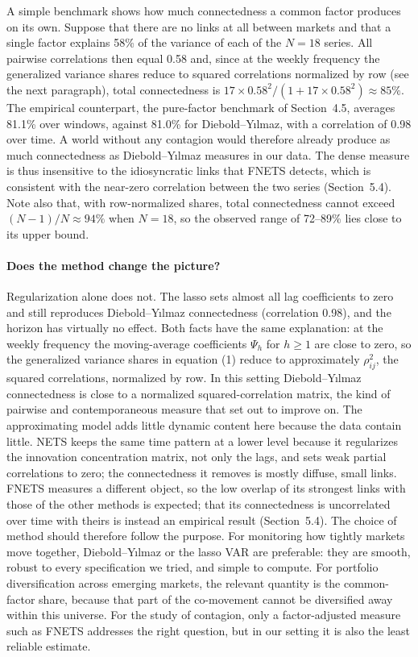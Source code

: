 A simple benchmark shows how much connectedness a common factor produces on its own. Suppose that there are no links at all between markets and that a single factor explains 58\% of the variance of each of the $N=18$ series. All pairwise correlations then equal 0.58 and, since at the weekly frequency the generalized variance shares reduce to squared correlations normalized by row (see the next paragraph), total connectedness is $17 \times 0.58^2 / (1 + 17 \times 0.58^2) \approx 85\%$. The empirical counterpart, the pure-factor benchmark of Section~4.5, averages 81.1\% over windows, against 81.0\% for Diebold--Y{\i}lmaz, with a correlation of 0.98 over time. A world without any contagion would therefore already produce as much connectedness as Diebold--Y{\i}lmaz measures in our data. The dense measure is thus insensitive to the idiosyncratic links that FNETS detects, which is consistent with the near-zero correlation between the two series (Section~5.4). Note also that, with row-normalized shares, total connectedness cannot exceed $(N-1)/N \approx 94\%$ when $N=18$, so the observed range of 72--89\% lies close to its upper bound.

\paragraph{Does the method change the picture?}
Regularization alone does not. The lasso sets almost all lag coefficients to zero and still reproduces Diebold--Y{\i}lmaz connectedness (correlation 0.98), and the horizon has virtually no effect. Both facts have the same explanation: at the weekly frequency the moving-average coefficients $\Psi_h$ for $h \geq 1$ are close to zero, so the generalized variance shares in equation (1) reduce to approximately $\rho_{ij}^2$, the squared correlations, normalized by row. In this setting Diebold--Y{\i}lmaz connectedness is close to a normalized squared-correlation matrix, the kind of pairwise and contemporaneous measure that \citet{diebold2014network} set out to improve on. The approximating model adds little dynamic content here because the data contain little. NETS keeps the same time pattern at a lower level because it regularizes the innovation concentration matrix, not only the lags, and sets weak partial correlations to zero; the connectedness it removes is mostly diffuse, small links. FNETS measures a different object, so the low overlap of its strongest links with those of the other methods is expected; that its connectedness is uncorrelated over time with theirs is instead an empirical result (Section~5.4). The choice of method should therefore follow the purpose. For monitoring how tightly markets move together, Diebold--Y{\i}lmaz or the lasso VAR are preferable: they are smooth, robust to every specification we tried, and simple to compute. For portfolio diversification across emerging markets, the relevant quantity is the common-factor share, because that part of the co-movement cannot be diversified away within this universe. For the study of contagion, only a factor-adjusted measure such as FNETS addresses the right question, but in our setting it is also the least reliable estimate.


